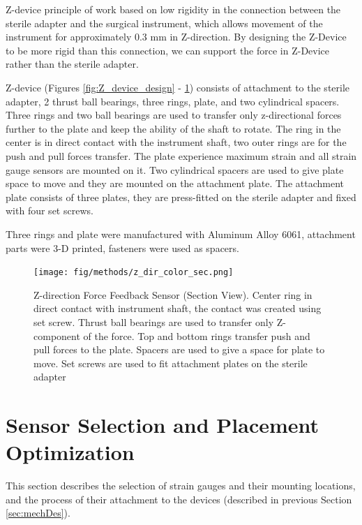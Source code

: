 Z-device principle of work based on low rigidity in the connection between the sterile adapter and the surgical instrument, which allows movement of the instrument for approximately 0.3 mm in Z-direction. By designing the Z-Device to be more rigid than this connection, we can support the force in Z-Device rather than the sterile adapter. 

Z-device (Figures \ref{fig:Z_device_design} - \ref{fig:Z-direction_sec}) consists of attachment to the sterile adapter, 2 thrust ball bearings, three rings, plate, and two cylindrical spacers. Three rings and two ball bearings are used to transfer only z-directional forces further to the plate and keep the ability of the shaft to rotate. The ring in the center is in direct contact with the instrument shaft, two outer rings are for the push and pull forces transfer. The plate experience maximum strain and all strain gauge sensors are mounted on it.  Two cylindrical spacers are used to give plate space to move and they are mounted on the attachment plate. The attachment plate consists of three plates, they are press-fitted on the sterile adapter and fixed with four set screws.

Three rings and plate were manufactured with Aluminum Alloy 6061, attachment parts were 3-D printed, fasteners were used as spacers.

\begin{figure}[h]
	\begin{center}
		\texttt{[image: fig/methods/z\_dir\_color\_sec.png]}
	\end{center}
	\vspace{-4mm}
	\caption[Z-direction Force Feedback Sensor (Section View)]
	{Z-direction Force Feedback Sensor (Section View). Center ring in direct contact with instrument shaft, the contact was created using set screw. Thrust ball bearings are used to transfer only Z-component of the force. Top and bottom rings transfer push and pull forces to the plate. Spacers are used to give a space for plate to move. Set screws are used to fit attachment plates on the sterile adapter}
	\label{fig:Z-direction_sec}
	\vspace{-2mm}
\end{figure}

\section{Sensor Selection and Placement Optimization}
\label{sec:SimMod}
This section describes the selection of strain gauges and their mounting locations, and the process of their attachment to the devices (described in previous Section \ref{sec:mechDes}).

